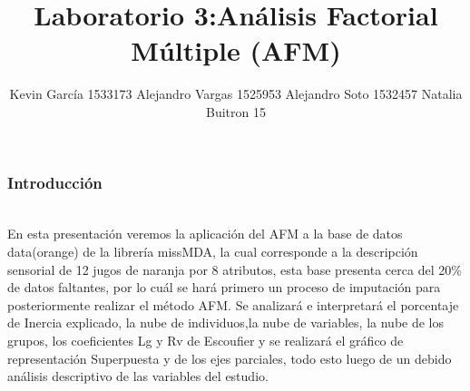 \documentclass[12pt]{beamer}
\author[Kevin - Alejandro x2 - Natalia ]{Kevin García 1533173 \newline Alejandro Vargas 1525953 \newline Alejandro Soto 1532457 \newline Natalia Buitron 15}
\title[Análisis Factorial Múltiple (AFM)]{Laboratorio 3:Análisis Factorial Múltiple (AFM)}
\begin{document}
\justify
\begin{frame}
\titlepage
\end{frame}

\begin{frame}
\frametitle{Introducción}
~\\En esta presentación veremos la aplicación del AFM a la base de datos data(orange) de la librería missMDA, la cual corresponde a la descripción sensorial de 12 jugos de naranja por 8 atributos, esta base presenta cerca del 20\% de datos faltantes, por lo cuál se hará primero un proceso de imputación para posteriormente realizar el método AFM. Se analizará e interpretará el porcentaje de Inercia explicado, la nube de individuos,la nube de variables, la nube de los grupos, los coeficientes Lg y Rv de Escoufier y se realizará el gráfico de representación Superpuesta y de los ejes parciales, todo esto luego de un debido análisis descriptivo de las variables del estudio.
\end{frame}
\end{document}
